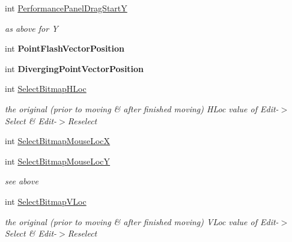\begin{DoxyCompactItemize}
\mbox{\label{class_t_interface_a203fbc2c91d611c8f0cf64a18336793d}} 
int \mbox{\hyperlink{class_t_interface_a203fbc2c91d611c8f0cf64a18336793d}{Performance\+Panel\+Drag\+StartY}}
\begin{DoxyCompactList}\small\item\em as above for \textquotesingle{}Y\textquotesingle{} \end{DoxyCompactList}\item 
\mbox{\label{class_t_interface_a8de4dd369bbe7242656b440db1fb1a37}} 
int {\bfseries Point\+Flash\+Vector\+Position}
\item 
\mbox{\label{class_t_interface_a3ba3ac4978e08f567f4883f351013c36}} 
int {\bfseries Diverging\+Point\+Vector\+Position}
\item 
\mbox{\label{class_t_interface_a866932aa49ae00877e2f6f310aa9354b}} 
int \mbox{\hyperlink{class_t_interface_a866932aa49ae00877e2f6f310aa9354b}{Select\+Bitmap\+H\+Loc}}
\begin{DoxyCompactList}\small\item\em the original (prior to moving \& after finished moving) H\+Loc value of Edit-\/$>$Select \& Edit-\/$>$Reselect \end{DoxyCompactList}\item 
int \mbox{\hyperlink{class_t_interface_ae217ab17f77c5f5e6008cdd7d5059e5a}{Select\+Bitmap\+Mouse\+LocX}}
\item 
\mbox{\label{class_t_interface_a0ecaf98380c5adbbb90a8ee2d0b51149}} 
int \mbox{\hyperlink{class_t_interface_a0ecaf98380c5adbbb90a8ee2d0b51149}{Select\+Bitmap\+Mouse\+LocY}}
\begin{DoxyCompactList}\small\item\em see above \end{DoxyCompactList}\item 
\mbox{\label{class_t_interface_ac08eaf19ddd0ab9b43d54accca9da264}} 
int \mbox{\hyperlink{class_t_interface_ac08eaf19ddd0ab9b43d54accca9da264}{Select\+Bitmap\+V\+Loc}}
\begin{DoxyCompactList}\small\item\em the original (prior to moving \& after finished moving) V\+Loc value of Edit-\/$>$Select \& Edit-\/$>$Reselect \end{DoxyCompactList}\item 

\end{DoxyCompactItemize}
